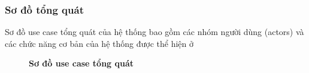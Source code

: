 \subsubsection{Sơ đồ tổng quát}
Sơ đồ use case tổng quát của hệ thống bao gồm các nhóm người dùng (actors) và các chức năng cơ bản của hệ thống được thể hiện ở 

\begin{figure}[H]
  \centering
  
  \caption{\bfseries Sơ đồ use case tổng quát}
  \label{fig:c2p1general}
\end{figure}